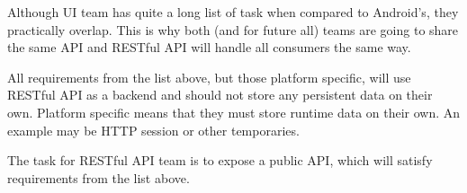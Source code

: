 	Although UI team has quite a long list of task when compared to Android's, they practically overlap.
	This is why both (and for future all) teams are going to share the same API and RESTful API will handle all consumers
	the same way.

	All requirements from the list above, but those platform specific, will use RESTful API as a backend and should not
	store any persistent data on their own. Platform specific means that they must store runtime data on their own. An
	example may be HTTP session or other temporaries.

	The task for RESTful API team is to expose a public API, which will satisfy requirements from the list above.
	 